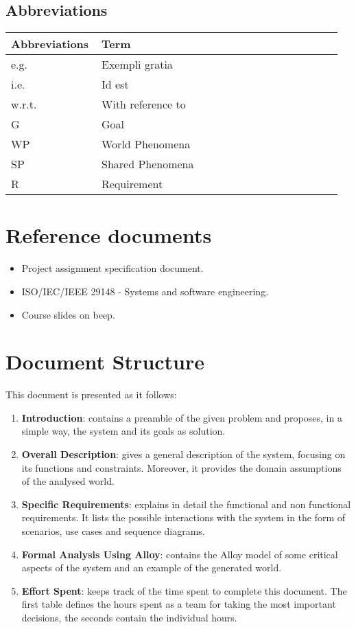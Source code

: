 \subsection{Abbreviations}
\begin{center}
	\begin{tabular}{@{}p{0.25\linewidth} p{0.71\linewidth}@{}}
		\toprule
		\textbf{Abbreviations} & \textbf{Term}\\
		\midrule
		e.g. & Exempli gratia\\
		i.e. & Id est\\
		w.r.t. & With reference to\\
		G & Goal\\
		WP & World Phenomena\\
		SP & Shared Phenomena\\
        R & Requirement\\
		\bottomrule
	\end{tabular}
\end{center}

\section{Reference documents}
\begin{itemize}
	\item Project assignment specification document.
	\item ISO/IEC/IEEE 29148 - Systems and software engineering.
	\item Course slides on beep.
\end{itemize}

\section{Document Structure}
This document is presented as it follows:
\begin{enumerate}
	\item \textbf{Introduction}: contains a preamble of the given problem and proposes, in a simple way, the system and its goals as solution.

	\item \textbf{Overall Description}: gives a general description of the system, focusing on its functions and constraints. Moreover, it provides the domain assumptions of the analysed world.

	\item \textbf{Specific Requirements}: explains in detail the functional and non functional requirements. It lists the possible interactions with the system in the form of scenarios, use cases and sequence diagrams.

	\item \textbf{Formal Analysis Using Alloy}: contains the Alloy model of some critical aspects of the system and an example of the generated world.

	\item \textbf{Effort Spent}: keeps track of the time spent to complete this document. The first table defines the hours spent	as a team for taking the most important decisions, the seconds contain the individual hours.
\end{enumerate}
